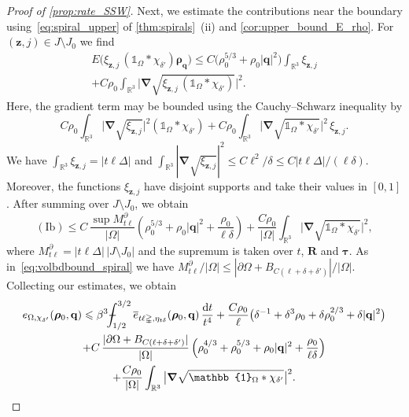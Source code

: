\documentclass[final,reqno]{amsart}
\theoremstyle{remark}
\renewcommand{\le}{\leqslant}
\newcommand{\ol}[1]{\overline{#1}}
\newcommand{\RR}{\mathbb{R}}
\newcommand{\iden}{\mathbb{1}}
\newcommand{\grad}{\bm{\nabla}}
\newcommand{\tetra}{\mathbb{\Delta}}
\newcommand{\dd}{\mathrm{d}}
\def\Xint#1{\mathchoice
{\XXint\displaystyle\textstyle{#1}}
{\XXint\textstyle\scriptstyle{#1}}
{\XXint\scriptstyle\scriptscriptstyle{#1}}
{\XXint\scriptscriptstyle\scriptscriptstyle{#1}}
\!\int}
\def\XXint#1#2#3{{\setbox0=\hbox{$#1{#2#3}{\int}$ }
\vcenter{\hbox{$#2#3$ }}\kern-.6\wd0}}
\def\dashint{\Xint-}
\begin{document}
\begin{proof}[Proof of \cref{prop:rate_SSW}]
Next, we estimate the contributions near the boundary using~\cref{eq:spiral_upper} of \cref{thm:spirals}~(ii) and \cref{cor:upper_bound_E_rho}. For $(\mathbf{z},j)\in J\setminus J_0$ we find
\begin{multline*}
 E\big(\xi_{\mathbf{z},j}\,(\iden_\Omega\ast\chi_{\delta'})\bm{\rho}_{\mathbf{q}}\big)
 \le C\big(\rho_0^{5/3}+\rho_0|\mathbf{q}|^2\big)\int_{\RR^3}\xi_{\mathbf{z},j}\\
 +C\rho_0\int_{\RR^3}\Big|\grad\sqrt{\xi_{\mathbf{z},j}\,(\iden_\Omega\ast\chi_{\delta'})}\Big|^2.
\end{multline*}
Here, the gradient term may be bounded using the Cauchy--Schwarz inequality by
\[
 C\rho_0\int_{\RR^3}\big|\grad\sqrt{\xi_{\mathbf{z},j}}\big|^2(\iden_\Omega\ast\chi_{\delta'})
 +C\rho_0\int_{\RR^3}\big|\grad\sqrt{\iden_\Omega\ast\chi_{\delta'}}\big|^2\,\xi_{\mathbf{z},j}.
\]
We have $\int_{\RR^3}\xi_{\mathbf{z},j}=|t\ell\tetra|$ and $\int_{\RR^3}|\grad\sqrt{\xi_{\mathbf{z},j}}|^2\le C\ell^2/\delta\le C|t\ell\tetra|/(\ell\delta)$. Moreover, the functions $\xi_{\mathbf{z},j}$ have disjoint supports and take their values in $[0,1]$. After summing over $J\setminus J_0$, we obtain
\begin{equation*}
 \mathrm{(Ib)}\le C\,\frac{\sup M^\partial_{t\ell}}{|\Omega|}
 \left(\rho_0^{5/3}+\rho_0|\mathbf{q}|^2+\frac{\rho_0}{\ell\delta}\right)
 +\frac{C\rho_0}{|\Omega|}\int_{\RR^3}\big|\grad\sqrt{\iden_\Omega\ast\chi_{\delta'}}\big|^2,
\end{equation*}
where $M^\partial_{t\ell}=|t\ell\tetra|\,|J\setminus J_0|$ and the supremum is taken over $t$, $\mathbf{R}$ and $\bm{\tau}$. As in~\cref{eq:volbdbound_spiral} we have $M^\partial_{t\ell}/|\Omega|\le|\partial\Omega+B_{C(\ell+\delta+\delta')}|/|\Omega|$. Collecting our estimates, we obtain
\begin{multline}\label{eq:two_scales_spiral_upper}
 e_{\Omega,\chi_{\delta'}}(\bm{\rho}_0,\mathbf{q})
 \le \beta^3\dashint_{1/2}^{3/2}\ol e_{t\ell\tetra,\eta_{t\delta}}(\bm{\rho}_0,\mathbf{q})\,\frac{\dd t}{t^4}
 +\frac{C\rho_0}{\ell}\big(\delta^{-1}+\delta^3\rho_0+\delta\rho_0^{2/3}+\delta|\mathbf{q}|^2\big)\\
 +C\,\frac{|\partial\Omega+B_{C(\ell+\delta+\delta')}|}{|\Omega|}\left(\rho_0^{4/3}+\rho_0^{5/3}+\rho_0|\mathbf{q}|^2+\frac{\rho_0}{\ell\delta}\right)\\
 +\frac{C\rho_0}{|\Omega|}\int_{\RR^3}\big|\grad\sqrt{\iden_\Omega\ast\chi_{\delta'}}\big|^2.
\end{multline}


\end{proof}
\end{document}
